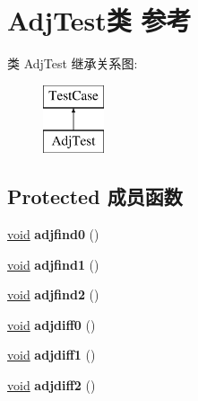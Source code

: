 \hypertarget{class_adj_test}{}\section{Adj\+Test类 参考}
\label{class_adj_test}
类 Adj\+Test 继承关系图\+:\begin{figure}[H]
\begin{center}
\leavevmode
\includegraphics[height=2.000000cm]{class_adj_test}
\end{center}
\end{figure}
\subsection*{Protected 成员函数}
\begin{DoxyCompactItemize}
\item 
\mbox{\label{class_adj_test_aa66d183cb74e7063a086b99c3f363693}} 
\hyperlink{interfacevoid}{void} {\bfseries adjfind0} ()
\item 
\mbox{\label{class_adj_test_a6b84dcaad69f38e2d29060c15c9c792a}} 
\hyperlink{interfacevoid}{void} {\bfseries adjfind1} ()
\item 
\mbox{\label{class_adj_test_a64c32c4317009befed3872be2c2993cb}} 
\hyperlink{interfacevoid}{void} {\bfseries adjfind2} ()
\item 
\mbox{\label{class_adj_test_a0965dbee916fa94830141277d82f6aff}} 
\hyperlink{interfacevoid}{void} {\bfseries adjdiff0} ()
\item 
\mbox{\label{class_adj_test_ad701bb96749fa9b5e71783660b7ebd39}} 
\hyperlink{interfacevoid}{void} {\bfseries adjdiff1} ()
\item 
\mbox{\label{class_adj_test_aaa5d472fc8a9a4d116dc601d1da5cd2d}} 
\hyperlink{interfacevoid}{void} {\bfseries adjdiff2} ()
\end{DoxyCompactItemize}
